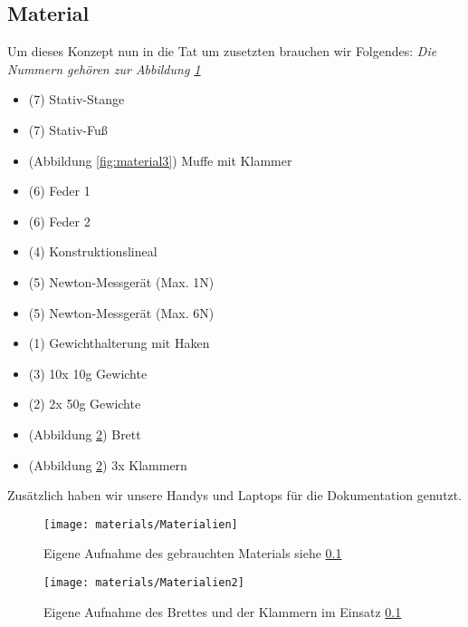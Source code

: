 \documentclass[../main.tex]{subfiles} %
\begin{document}
        \subsection{Material}\label{subsec:material}

            Um dieses Konzept nun in die Tat um zusetzten brauchen wir Folgendes:
            \textit{Die Nummern gehören zur Abbildung \ref{fig:material}}
            \begin{itemize}
                \item (7) Stativ-Stange
                \item (7) Stativ-Fuß
                \item (Abbildung \ref{fig:material3}) Muffe mit Klammer
                \item (6) Feder 1
                \item (6) Feder 2
                \item (4) Konstruktionslineal
                \item (5) Newton-Messgerät (Max. 1N)
                \item (5) Newton-Messgerät (Max. 6N)
                \item (1) Gewichthalterung mit Haken
                \item (3) 10x 10g Gewichte
                \item (2) 2x 50g Gewichte
                \item (Abbildung \ref{fig:material2}) Brett
                \item (Abbildung \ref{fig:material2}) 3x Klammern
            \end{itemize}
            \noindent
            Zusätzlich haben wir unsere Handys und Laptops für die Dokumentation genutzt.

            \begin{figure}[H]
                \centering
                \texttt{[image: materials/Materialien]}
                \caption{Eigene Aufnahme des gebrauchten Materials siehe \ref{subsec:material}}
                \label{fig:material}
            \end{figure}

            \begin{figure}[H]
                \centering
                \texttt{[image: materials/Materialien2]}
                \caption{Eigene Aufnahme des Brettes und der Klammern im Einsatz \ref{subsec:material}}
                \label{fig:material2}
            \end{figure}
\end{document}
